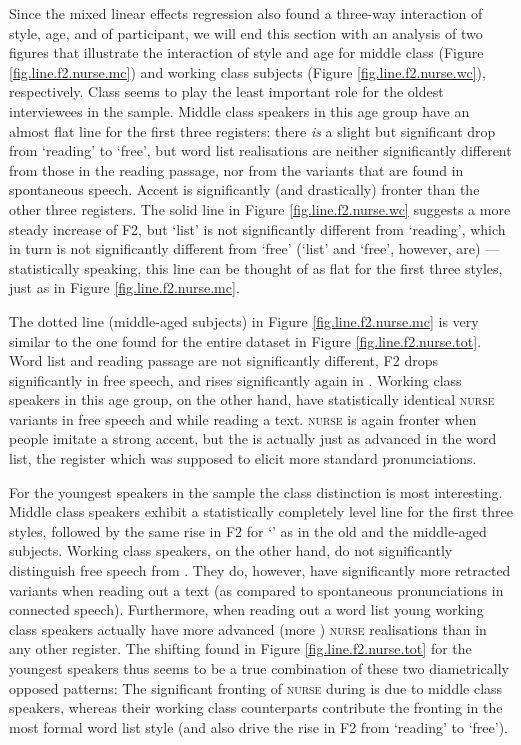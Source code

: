 Since the mixed linear effects regression also found a three-way interaction of style, age, and  of participant, we will end this section with an analysis of two figures that illustrate the interaction of style and age for middle class (Figure \ref{fig.line.f2.nurse.mc}) and working class subjects (Figure \ref{fig.line.f2.nurse.wc}), respectively.
Class seems to play the least important role for the oldest interviewees in the sample.
Middle class speakers in this age group have an almost flat line for the first three registers: there \emph{is} a slight but significant drop from `reading' to `free', but word list realisations are neither significantly different from those in the reading passage, nor from the variants that are found in spontaneous speech.
Accent  is significantly (and drastically) fronter than the other three registers.
The solid line in Figure \ref{fig.line.f2.nurse.wc} suggests a more steady increase of F2, but `list' is not significantly different from `reading', which in turn is not significantly different from `free' (`list' and `free', however, are) --- statistically speaking, this line can be thought of as flat for the first three styles, just as in Figure \ref{fig.line.f2.nurse.mc}.

The dotted line (middle-aged subjects) in Figure \ref{fig.line.f2.nurse.mc} is very similar to the one found for the entire dataset in Figure \ref{fig.line.f2.nurse.tot}.
Word list and reading passage are not significantly different, F2 drops significantly in free speech, and rises significantly again in .
Working class speakers in this age group, on the other hand, have statistically identical \textsc{nurse} variants in free speech and while reading a text.
\textsc{nurse} is again fronter when people imitate a strong  accent, but the  is actually just as advanced in the word list, the register which was supposed to elicit more standard pronunciations.

For the youngest speakers in the sample the class distinction is most interesting.
Middle class speakers exhibit a statistically completely level line for the first three styles, followed by the same rise in F2 for `' as in the old and the middle-aged subjects.
Working class speakers, on the other hand, do not significantly distinguish free speech from .
They do, however, have significantly more retracted variants when reading out a text (as compared to spontaneous pronunciations in connected speech).
Furthermore, when reading out a word list young working class speakers actually have more advanced (more ) \textsc{nurse} realisations than in any other register.
The shifting found in Figure \ref{fig.line.f2.nurse.tot} for the youngest speakers thus seems to be a true combination of these two diametrically opposed patterns: The significant fronting of \textsc{nurse} during  is due to middle class speakers, whereas their working class counterparts contribute the fronting in the most formal word list style (and also drive the rise in F2 from `reading' to `free').

